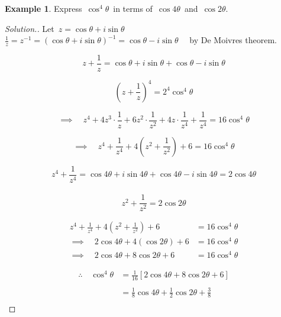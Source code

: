 \documentclass[11pt,a4paper]{article}
\theoremstyle{definition}
\newtheorem{example}[thm]{Example}
\newenvironment{solution}
  {\renewcommand{\qedsymbol}{}\begin{proof}[\textit{Solution}.]}
  {\end{proof}}
\begin{document}
\begin{example}

Express $\, \cos^4\theta\,$ in terms of $\, \cos 4\theta\,$ and $\, \cos 2\theta$.
\end{example}
\begin{solution}

Let $\,  z = \cos \theta + i\sin \theta$\\

$\frac{1}{z} = z^{-1} = \left(\cos \theta + i\sin \theta\right)^{-1} = \cos \theta - i\sin \theta\quad $ by De Moivres theorem.

$$ z + \frac{1}{z} = \cos \theta + i\sin \theta + \cos\theta - i\sin \theta$$

$$\left(z + \frac{1}{z}\right)^4 = 2^4\cos^4\theta$$


$$\implies \quad  z^4 + 4z^3\cdot \frac{1}{z}+ 6z^2\cdot\frac{1}{z^2} + 4z\cdot \frac{1}{z^4} + \frac{1}{z^4} = 16\cos^4\theta$$

$$\implies\quad  z^4 + \frac{1}{z^4} + 4\left( z^2 + \frac{1}{z^2}\right) + 6  = 16\cos^4\theta$$

$$z^4 + \frac{1}{z^4} = \cos 4\theta + i \sin 4\theta  + \cos 4\theta - i\sin 4\theta = 2\cos 4\theta$$\\



$$z^2 + \frac{1}{z^2} = 2\cos 2\theta$$



\begin{align*}
z^4 + \frac{1}{z^4} + 4 \left(z^2 + \frac{1}{z^2}\right) + 6 & = 16\cos^4\theta\\
\implies\quad  2\cos 4\theta + 4\left(\cos 2\theta\right) + 6 &  = 16\cos^4\theta\\
\implies\quad  2\cos 4\theta + 8\cos 2\theta + 6 &  = 16\cos^4\theta
\end{align*}



\begin{align*}
\therefore\quad  \cos^4\theta & = \frac{1}{16}\left[2\cos 4\theta + 8\cos 2\theta + 6 \right]\\\\
& = \frac{1}{8}\cos 4\theta + \frac{1}{2}\cos 2\theta + \frac{3}{8}\\ 
\end{align*}

















\end{solution}
\end{document}
